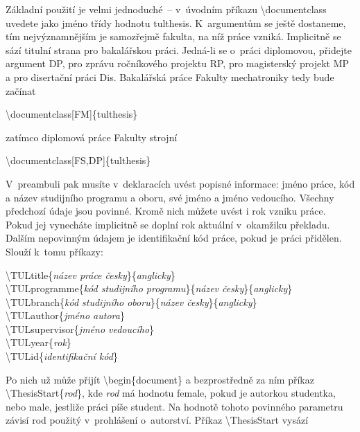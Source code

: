 \documentclass[FM,DP]{tulthesis}
\newcommand{\argument}[1]{{\ttfamily\color{\tulcolor}#1}}
\newcommand{\prikaz}[1]{\argument{\textbackslash #1}}
\newenvironment{myquote}{\begin{list}{}{\setlength\leftmargin\parindent}\item[]}{\end{list}}
\newenvironment{listing}{\begin{myquote}\color{\tulcolor}}{\end{myquote}}
\begin{document}
Základní použití je velmi jednoduché~-- v~úvodním příkazu
\prikaz{documentclass} uvedete jako jméno třídy hodnotu \argument{tulthesis}.
K~argumentům se ještě dostaneme, tím nejvýznamnějším je samozřejmě fakulta, na
níž práce vzniká. Implicitně se sází titulní strana pro bakalářskou práci.
Jedná-li se o~práci diplomovou, přidejte argument \argument{DP}, pro zprávu
ročníkového projektu \argument{RP}, pro magisterský projekt \argument{MP} a pro
disertační práci \argument{Dis}. Bakalářská práce Fakulty mechatroniky tedy
bude začínat

\begin{listing}
\prikaz{documentclass[FM]\{tulthesis\}}
\end{listing}

zatímco diplomová práce Fakulty strojní

\begin{listing}
\prikaz{documentclass[FS,DP]\{tulthesis\}}
\end{listing}

V~preambuli pak musíte v~deklaracích uvést popisné informace: jméno práce, kód
a název studijního programu a oboru, své jméno a jméno vedoucího. Všechny
předchozí údaje jsou povinné. Kromě nich můžete uvést i rok vzniku práce. Pokud
jej vynecháte implicitně se doplní rok aktuální v~okamžiku překladu. Dalším
nepovinným údajem je identifikační kód práce, pokud je práci přidělen. Slouží
k~tomu příkazy:

\begin{listing}
\prikaz{TULtitle\{\emph{název práce česky}\}\{\emph{anglicky}\}}\\
\prikaz{TULprogramme\{\emph{kód studijního programu}\}\{\emph{název česky}\}\{\emph{anglicky}\}}\\
\prikaz{TULbranch\{\emph{kód studijního oboru}\}\{\emph{název česky}\}\{\emph{anglicky}\}}\\
\prikaz{TULauthor\{\emph{jméno autora}\}}\\
\prikaz{TULsupervisor\{\emph{jméno vedoucího}\}}\\
\prikaz{TULyear\{\emph{rok}\}}\\
\prikaz{TULid\{\emph{identifikační kód}\}}
\end{listing}

Po nich už může přijít \prikaz{begin\{document\}} a bezprostředně za ním příkaz
\prikaz{ThesisStart\{\emph{rod}\}}, kde \argument{\emph{rod}} má hodnotu
\argument{female}, pokud je autorkou studentka, nebo \argument{male}, jestliže
práci píše student. Na hodnotě tohoto povinného parametru závisí rod použitý
v~prohlášení o~autorství. Příkaz \prikaz{ThesisStart} vysází
\end{document}
